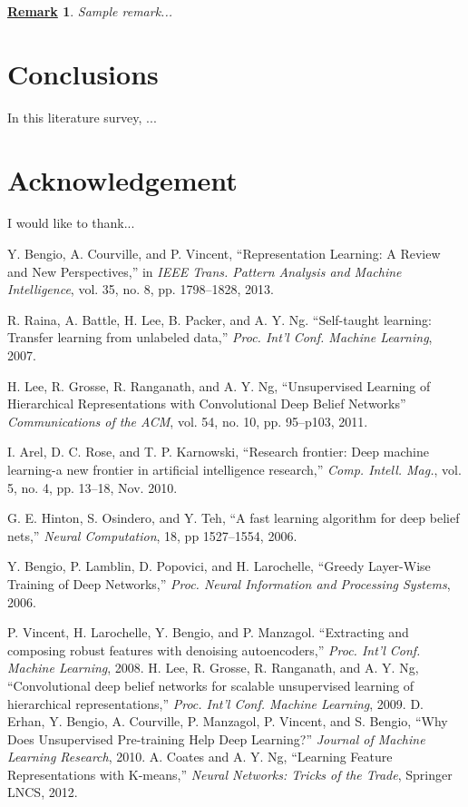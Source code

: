 \documentclass[conference]{IEEEtran}
\newtheorem{remark}{\underline{Remark}}
\begin{document}
\begin{remark}
Sample remark...
\end{remark}


\section{Conclusions}

In this literature survey, ...

\section*{Acknowledgement}
I would like to thank...


\begin{thebibliography}{99}

 Y. Bengio, A. Courville, and P. Vincent, ``Representation Learning: A Review and New Perspectives,'' in \textit{IEEE Trans. Pattern Analysis and Machine Intelligence}, vol. 35, no. 8, pp. 1798--1828, 2013.

 R. Raina, A. Battle, H. Lee, B. Packer, and A. Y. Ng. ``Self-taught learning: Transfer learning from unlabeled data,'' \textit{Proc. Int'l Conf. Machine Learning}, 2007.

 H. Lee, R. Grosse, R. Ranganath, and A. Y. Ng, ``Unsupervised Learning of Hierarchical Representations with Convolutional Deep Belief Networks'' \textit{Communications of the ACM}, vol. 54, no. 10, pp. 95--p103, 2011.


 I. Arel, D. C. Rose, and T. P. Karnowski, ``Research frontier: Deep machine learning-a new frontier in artificial intelligence research,'' \textit{Comp. Intell. Mag.}, vol. 5, no. 4, pp. 13--18, Nov. 2010.

 G. E. Hinton, S. Osindero, and Y. Teh, ``A fast learning algorithm for deep belief nets,'' \textit{Neural Computation}, 18, pp 1527--1554, 2006.

  Y. Bengio, P. Lamblin, D. Popovici, and H. Larochelle, ``Greedy Layer-Wise Training of Deep Networks,'' \textit{Proc. Neural Information and Processing Systems}, 2006.

 P. Vincent, H. Larochelle, Y. Bengio, and P. Manzagol. ``Extracting and composing robust features with denoising autoencoders,'' \textit{Proc. Int'l Conf. Machine Learning}, 2008.
 H. Lee, R. Grosse, R. Ranganath, and A. Y. Ng, ``Convolutional deep belief networks for scalable unsupervised learning of hierarchical representations,'' \textit{Proc. Int'l Conf. Machine Learning}, 2009.
 D. Erhan, Y. Bengio, A. Courville, P. Manzagol, P. Vincent, and S. Bengio, ``Why Does Unsupervised Pre-training Help Deep Learning?'' \textit{Journal of Machine Learning Research}, 2010.
 A. Coates and A. Y. Ng, ``Learning Feature Representations with K-means,'' \textit{Neural Networks: Tricks of the Trade}, Springer LNCS, 2012.


\end{thebibliography}
\end{document}
